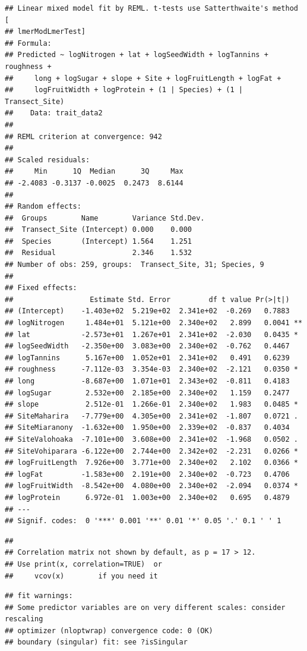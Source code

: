 \documentclass[
  12pt,
]{article}
\begin{document}
\begin{verbatim}
## Linear mixed model fit by REML. t-tests use Satterthwaite's method [
## lmerModLmerTest]
## Formula: 
## Predicted ~ logNitrogen + lat + logSeedWidth + logTannins + roughness +  
##     long + logSugar + slope + Site + logFruitLength + logFat +  
##     logFruitWidth + logProtein + (1 | Species) + (1 | Transect_Site)
##    Data: trait_data2
## 
## REML criterion at convergence: 942
## 
## Scaled residuals: 
##     Min      1Q  Median      3Q     Max 
## -2.4083 -0.3137 -0.0025  0.2473  8.6144 
## 
## Random effects:
##  Groups        Name        Variance Std.Dev.
##  Transect_Site (Intercept) 0.000    0.000   
##  Species       (Intercept) 1.564    1.251   
##  Residual                  2.346    1.532   
## Number of obs: 259, groups:  Transect_Site, 31; Species, 9
## 
## Fixed effects:
##                  Estimate Std. Error         df t value Pr(>|t|)   
## (Intercept)    -1.403e+02  5.219e+02  2.341e+02  -0.269   0.7883   
## logNitrogen     1.484e+01  5.121e+00  2.340e+02   2.899   0.0041 **
## lat            -2.573e+01  1.267e+01  2.341e+02  -2.030   0.0435 * 
## logSeedWidth   -2.350e+00  3.083e+00  2.340e+02  -0.762   0.4467   
## logTannins      5.167e+00  1.052e+01  2.341e+02   0.491   0.6239   
## roughness      -7.112e-03  3.354e-03  2.340e+02  -2.121   0.0350 * 
## long           -8.687e+00  1.071e+01  2.343e+02  -0.811   0.4183   
## logSugar        2.532e+00  2.185e+00  2.340e+02   1.159   0.2477   
## slope           2.512e-01  1.266e-01  2.340e+02   1.983   0.0485 * 
## SiteMaharira   -7.779e+00  4.305e+00  2.341e+02  -1.807   0.0721 . 
## SiteMiaranony  -1.632e+00  1.950e+00  2.339e+02  -0.837   0.4034   
## SiteValohoaka  -7.101e+00  3.608e+00  2.341e+02  -1.968   0.0502 . 
## SiteVohiparara -6.122e+00  2.744e+00  2.342e+02  -2.231   0.0266 * 
## logFruitLength  7.926e+00  3.771e+00  2.340e+02   2.102   0.0366 * 
## logFat         -1.583e+00  2.191e+00  2.340e+02  -0.723   0.4706   
## logFruitWidth  -8.542e+00  4.080e+00  2.340e+02  -2.094   0.0374 * 
## logProtein      6.972e-01  1.003e+00  2.340e+02   0.695   0.4879   
## ---
## Signif. codes:  0 '***' 0.001 '**' 0.01 '*' 0.05 '.' 0.1 ' ' 1
\end{verbatim}

\begin{verbatim}
## 
## Correlation matrix not shown by default, as p = 17 > 12.
## Use print(x, correlation=TRUE)  or
##     vcov(x)        if you need it
\end{verbatim}

\begin{verbatim}
## fit warnings:
## Some predictor variables are on very different scales: consider rescaling
## optimizer (nloptwrap) convergence code: 0 (OK)
## boundary (singular) fit: see ?isSingular
\end{verbatim}
\end{document}
